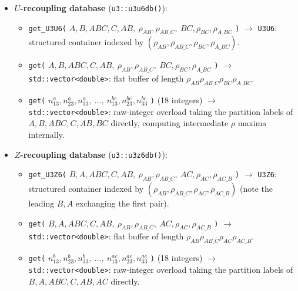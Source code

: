 \documentclass[aps,onecolumn,10pt,superscriptaddress,floatfix,nofootinbib]{revtex4}
\begin{document}
\begin{itemize}
    \item \textbf{$U$-recoupling database} (\verb|u3::u3u6db()|):
    \begin{itemize}
        \item \verb|get_U3U6(| $A,B,ABC,C,AB,\ \rho_{AB},\rho_{AB\_C},\ BC,\rho_{BC},\rho_{A\_BC}$ \verb|)| $\to$ \verb|U3U6|: structured container indexed by $(\rho_{AB},\rho_{AB\_C},\rho_{BC},\rho_{A\_BC})$.
        \item \verb|get(| $A,B,ABC,C,AB,\ \rho_{AB},\rho_{AB\_C},\ BC,\rho_{BC},\rho_{A\_BC}$ \verb|)| $\to$ \verb|std::vector<double>|: flat buffer of length $\rho_{AB}\rho_{AB\_C}\rho_{BC}\rho_{A\_BC}$.
        \item \verb|get(| $n_{13}^a,n_{23}^a,n_{33}^a,\ \dots,\ n_{13}^{bc},n_{23}^{bc},n_{33}^{bc}$ \verb|)| (18 integers) $\to$ \verb|std::vector<double>|: raw-integer overload taking the partition labels of $A,B,ABC,C,AB,BC$ directly, computing intermediate $\rho$ maxima internally.
    \end{itemize}

    \item \textbf{$Z$-recoupling database} (\verb|u3::u3z6db()|):
    \begin{itemize}
        \item \verb|get_U3Z6(| $B,A,ABC,C,AB,\ \rho_{AB},\rho_{AB\_C},\ AC,\rho_{AC},\rho_{AC\_B}$ \verb|)| $\to$ \verb|U3Z6|: structured container indexed by $(\rho_{AB},\rho_{AB\_C},\rho_{AC},\rho_{AC\_B})$ (note the leading $B,A$ exchanging the first pair).
        \item \verb|get(| $B,A,ABC,C,AB,\ \rho_{AB},\rho_{AB\_C},\ AC,\rho_{AC},\rho_{AC\_B}$ \verb|)| $\to$ \verb|std::vector<double>|: flat buffer of length $\rho_{AB}\rho_{AB\_C}\rho_{AC}\rho_{AC\_B}$.
        \item \verb|get(| $n_{13}^b,n_{23}^b,n_{33}^b,\ \dots,\ n_{13}^{ac},n_{23}^{ac},n_{33}^{ac}$ \verb|)| (18 integers) $\to$ \verb|std::vector<double>|: raw-integer overload taking the partition labels of $B,A,ABC,C,AB,AC$ directly.
    \end{itemize}


\end{itemize}
\end{document}
